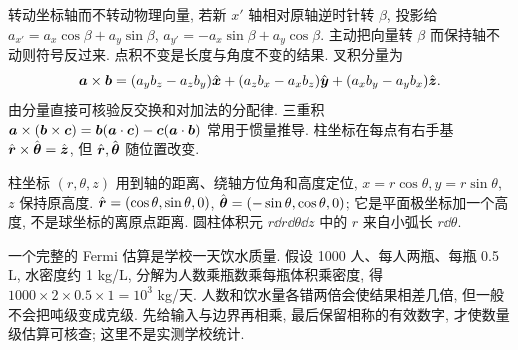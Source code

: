 转动坐标轴而不转动物理向量, 若新 $x'$ 轴相对原轴逆时针转 $\beta$, 投影给 $a_{x'}=a_x\cos\beta+a_y\sin\beta$, $a_{y'}=-a_x\sin\beta+a_y\cos\beta$. 主动把向量转 $\beta$ 而保持轴不动则符号反过来. 点积不变是长度与角度不变的结果. 叉积分量为
\begin{equation}
\boldsymbol{a}\times\boldsymbol{b}=(a_yb_z-a_zb_y)\hat{\boldsymbol{x}}+(a_zb_x-a_xb_z)\hat{\boldsymbol{y}}+(a_xb_y-a_yb_x)\hat{\boldsymbol{z}}.
\end{equation}
由分量直接可核验反交换和对加法的分配律. 三重积 $\boldsymbol{a}\times(\boldsymbol{b}\times\boldsymbol{c})=\boldsymbol{b}(\boldsymbol{a}\cdot\boldsymbol{c})-\boldsymbol{c}(\boldsymbol{a}\cdot\boldsymbol{b})$ 常用于惯量推导. 柱坐标在每点有右手基 $\hat{\boldsymbol{r}}\times\hat{\boldsymbol{\theta}}=\hat{\boldsymbol{z}}$, 但 $\hat{\boldsymbol{r}},\hat{\boldsymbol{\theta}}$ 随位置改变.

柱坐标 $(r,\theta,z)$ 用到轴的距离、绕轴方位角和高度定位, $x=r\cos\theta,y=r\sin\theta$, $z$ 保持原高度. $\hat{\boldsymbol{r}}=(\cos\theta,\sin\theta,0)$, $\hat{\boldsymbol{\theta}}=(-\sin\theta,\cos\theta,0)$; 它是平面极坐标加一个高度, 不是球坐标的离原点距离. 圆柱体积元 $r\dd r\dd\theta\dd z$ 中的 $r$ 来自小弧长 $r\dd\theta$.

一个完整的 Fermi 估算是学校一天饮水质量. 假设 1000 人、每人两瓶、每瓶 0.5 L, 水密度约 1 kg/L, 分解为人数乘瓶数乘每瓶体积乘密度, 得 $1000\times2\times0.5\times1=10^3$ kg/天. 人数和饮水量各错两倍会使结果相差几倍, 但一般不会把吨级变成克级. 先给输入与边界再相乘, 最后保留相称的有效数字, 才使数量级估算可核查; 这里不是实测学校统计.
